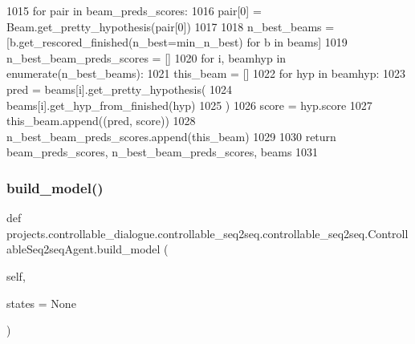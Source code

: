 \begin{DoxyCode}
1015         \textcolor{keywordflow}{for} pair \textcolor{keywordflow}{in} beam\_preds\_scores:
1016             pair[0] = Beam.get\_pretty\_hypothesis(pair[0])
1017 
1018         n\_best\_beams = [b.get\_rescored\_finished(n\_best=min\_n\_best) \textcolor{keywordflow}{for} b \textcolor{keywordflow}{in} beams]
1019         n\_best\_beam\_preds\_scores = []
1020         \textcolor{keywordflow}{for} i, beamhyp \textcolor{keywordflow}{in} enumerate(n\_best\_beams):
1021             this\_beam = []
1022             \textcolor{keywordflow}{for} hyp \textcolor{keywordflow}{in} beamhyp:
1023                 pred = beams[i].get\_pretty\_hypothesis(
1024                     beams[i].get\_hyp\_from\_finished(hyp)
1025                 )
1026                 score = hyp.score
1027                 this\_beam.append((pred, score))
1028             n\_best\_beam\_preds\_scores.append(this\_beam)
1029 
1030         \textcolor{keywordflow}{return} beam\_preds\_scores, n\_best\_beam\_preds\_scores, beams
1031 
\end{DoxyCode}
\mbox{\label{classprojects_1_1controllable__dialogue_1_1controllable__seq2seq_1_1controllable__seq2seq_1_1ControllableSeq2seqAgent_a4cecd20886ef127bbab1a756bb49fb75}} 
\subsubsection{\texorpdfstring{build\+\_\+model()}{build\_model()}}
{\footnotesize\ttfamily def projects.\+controllable\+\_\+dialogue.\+controllable\+\_\+seq2seq.\+controllable\+\_\+seq2seq.\+Controllable\+Seq2seq\+Agent.\+build\+\_\+model (\begin{DoxyParamCaption}\item[{}]{self,  }\item[{}]{states = {\ttfamily None} }\end{DoxyParamCaption})}

